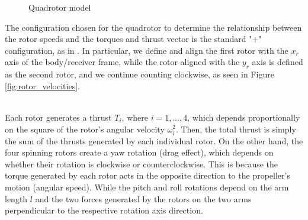 \documentclass[main]{subfiles}
\begin{document}
\begin{figure}
    \caption{Quadrotor model }
\end{figure}
The configuration chosen for the quadrotor to determine the 
relationship between the rotor speeds and the torques 
and thrust vector is the standard "+" configuration, 
as in \cite{figura_bella_drone, model_quadrotor, 
quadrotor_modeling_control_book, backstepping_control, geometric_control}. 
In particular, we define and align the first rotor with the \( x_r \) 
axis of the body/receiver frame, while the rotor aligned with the \( y_r \) 
axis is defined as the second rotor, and we continue counting clockwise,
as seen in Figure \ref{fig:rotor_velocities}.

\noindent\\
Each rotor generates a thrust \( T_i \), where \( i = 1, \dots, 4 \), 
which depends proportionally on the square of the rotor's angular velocity \( \omega_i^2 \). 
Then, the total thrust is simply the sum of the thrusts generated by each individual rotor. 
On the other hand, the four spinning rotors create a yaw rotation (drag effect), 
which depends on whether their rotation is clockwise or counterclockwise. 
This is because the torque generated by each rotor acts in the opposite 
direction to the propeller's motion (angular speed).
While the pitch and roll rotations depend on the arm length $l$ and the
two forces generated by the rotors on the two arms perpendicular to the respective 
rotation axis direction.
\end{document}
